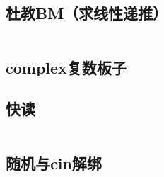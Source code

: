 \documentclass[a4paper,11pt]{article}
\begin{document}
\subsection{杜教BM（求线性递推）}
\inputminted[breaklines]{c++}{混合板子/杜教BM.cpp}
\subsection{complex复数板子}

\subsection{快读}
\inputminted[breaklines]{c++}{混合板子/快读.cpp}
\subsection{随机与cin解绑}
\inputminted[breaklines]{c++}{混合板子/随机与解绑.cpp}
\end{document}
